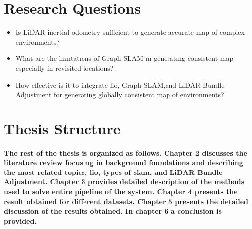 \section{Research Questions}

\begin{itemize}
	\item Is LiDAR inertial odometry sufficient to generate accurate map of complex environments?
	\item What are the limitations of Graph SLAM in generating consistent map especially in revisited locations?
	\item How effective is it to integrate \gls{lio}, Graph SLAM,and LiDAR Bundle Adjustment for generating globally consistent map of environments?
\end{itemize}
\section{Thesis Structure}
\paragraph{\textnormal{The rest of the thesis is organized as follows. Chapter 2 discusses the literature review focusing in background foundations and describing the most related topics; \gls{lio}, types of \gls{slam}, and LiDAR Bundle Adjustment. Chapter 3 provides detailed description of the methods used to solve entire pipeline of the system. Chapter 4 presents the result obtained for different datasets. Chapter 5 presents the detailed discussion of the results obtained. In chapter 6 a conclusion is provided.  }}
